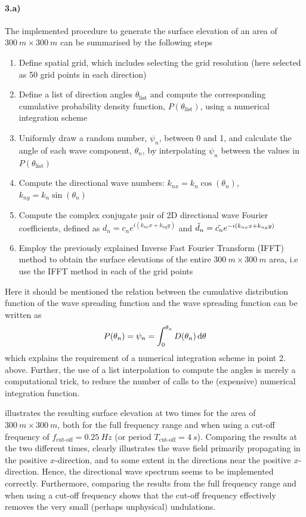 \paragraph{3.a) } The implemented procedure to generate the surface elevation of an area of $\SI{300}{m}\times \SI{300}{m}$ can be summarised by the following steps
\begin{enumerate}
    \item Define spatial grid, which includes selecting the grid resolution (here selected as 50 grid points in each direction)
    \item Define a list of direction angles $\theta_{\text{list}}$ and compute the corresponding cumulative probability density function, $P(\theta_{\text{list}})$, using a numerical integration scheme 
    \item Uniformly draw a random number, $\psi_n$, between 0 and 1, and calculate the angle of each wave component, $\theta_n$, by interpolating $\psi_n$ between the values in $P(\theta_{\text{list}})$
    \item Compute the directional wave numbers: $k_{nx}=k_n\cos{(\theta_n)}$, $k_{ny}=k_n\sin{(\theta_n)}$
    \item Compute the complex conjugate pair of 2D directional wave Fourier coefficients, defined as $d_n=c_n e^{i(k_{nx}x+k_{ny}y) }$ and $\Tilde{d}_n=\Tilde{c_n} e^{-i(k_{nx}x+k_{ny}y) }$
    \item Employ the previously explained Inverse Fast Fourier Transform (IFFT) method to obtain the surface elevations of the entire $\SI{300}{m}\times \SI{300}{m}$ area, i.e use the IFFT method in each of the grid points
\end{enumerate}
Here it should be mentioned the relation between the cumulative distribution function of the wave spreading function and the wave spreading function can be written as
\begin{equation}
    P(\theta_n) = \psi_n = \int_0^{\theta_n} D(\theta_n) \dif \theta 
\end{equation}
which explains the requirement of a numerical integration scheme in point 2. above. Further, the use of a list interpolation to compute the angles is merely a computational trick, to reduce the number of calls to the (expensive) numerical integration function.

 illustrates the resulting surface elevation at two times for the area of $\SI{300}{m}\times\SI{300}{m}$, both for the full frequency range and when using a cut-off frequency of $f_{\text{cut-off}}=\SI{0.25}{Hz}$ (or period $T_{\text{cut-off}}=\SI{4}{s}$). Comparing the results at the two different times, clearly illustrates the wave field primarily propagating in the positive $x$-direction, and to some extent in the directions near the positive $x$-direction. Hence, the directional wave spectrum seems to be implemented correctly. Furthermore, comparing the results from the full frequency range and when using a cut-off frequency shows that the cut-off frequency effectively removes the very small (perhaps unphysical) undulations.

